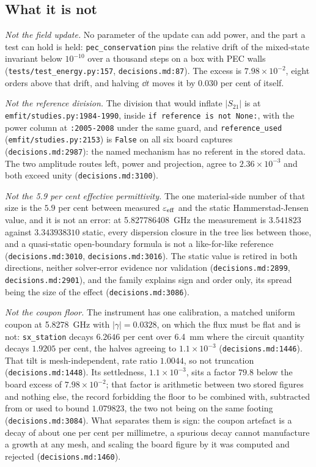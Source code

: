\subsection{What it is not}
\label{sec:openproblem-not}

\emph{Not the field update.} No parameter of the update can add power, and the part a test can hold is held:
\texttt{pec\_conservation} pins the relative drift of the mixed-state invariant below $10^{-10}$ over a thousand
steps on a box with PEC walls (\texttt{tests/test\_energy.py:157}, \texttt{decisions.md:87}). The excess is
$7.98\times10^{-2}$, eight orders above that drift, and halving $\dd t$ moves it by $0.030$ per cent of itself.

\emph{Not the reference division.} The division that would inflate $|S_{21}|$ is at
\texttt{emfit/studies.py:1984-1990}, inside \texttt{if reference is not None:}, with the power column at
\texttt{:2005-2008} under the same guard, and \texttt{reference\_used} (\texttt{emfit/studies.py:2153}) is
\texttt{False} on all six board captures (\texttt{decisions.md:2987}): the named mechanism has no referent in the
stored data. The two amplitude routes left, power and projection, agree to $2.36\times10^{-3}$ and both exceed
unity (\texttt{decisions.md:3100}).

\emph{Not the 5.9 per cent effective permittivity.} The one material-side number of that size is the $5.9$ per cent
between measured $\varepsilon_{\mathrm{eff}}$ and the static Hammerstad-Jensen value, and it is not an error: at
\SI{5.827786408}{\giga\hertz} the measurement is $3.541823$ against $3.343938310$ static, every dispersion closure
in the tree lies between those, and a quasi-static open-boundary formula is not a like-for-like reference
(\texttt{decisions.md:3010}, \texttt{decisions.md:3016}). The static value is retired in both directions, neither
solver-error evidence nor validation (\texttt{decisions.md:2899}, \texttt{decisions.md:2901}), and the family
explains sign and order only, its spread being the size of the effect (\texttt{decisions.md:3086}).

\emph{Not the coupon floor.} The instrument has one calibration, a matched uniform coupon at \SI{5.8278}{\giga\hertz}
with $|\gamma| = 0.0328$, on which the flux must be flat and is not: \texttt{sx\_station} decays $6.2646$ per cent
over \SI{6.4}{mm} where the circuit quantity decays $1.9205$ per cent, the halves agreeing to $1.1\times10^{-3}$
(\texttt{decisions.md:1446}). That tilt is mesh-independent, rate ratio $1.0044$, so not truncation
(\texttt{decisions.md:1448}). Its settledness, $1.1\times10^{-3}$, sits a factor $79.8$ below the board excess of
$7.98\times10^{-2}$; that factor is arithmetic between two stored figures and nothing else, the record forbidding
the floor to be combined with, subtracted from or used to bound $1.079823$, the two not being on the same footing
(\texttt{decisions.md:3084}). What separates them is sign: the coupon artefact is a decay of about one per cent per
millimetre, a spurious decay cannot manufacture a growth at any mesh, and scaling the board figure by it was
computed and rejected (\texttt{decisions.md:1460}).

